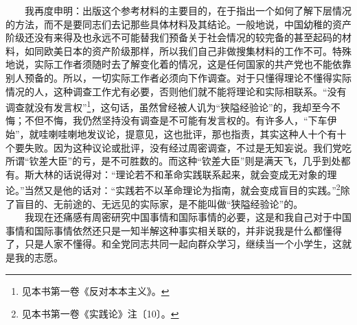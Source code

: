 \documentclass[cn,11pt,chinese]{elegantbook}
\begin{document}
　　我再度申明：出版这个参考材料的主要目的，在于指出一个如何了解下层情况的方法，而不是要同志们去记那些具体材料及其结论。一般地说，中国幼稚的资产阶级还没有来得及也永远不可能替我们预备关于社会情况的较完备的甚至起码的材料，如同欧美日本的资产阶级那样，所以我们自己非做搜集材料的工作不可。特殊地说，实际工作者须随时去了解变化着的情况，这是任何国家的共产党也不能依靠别人预备的。所以，一切实际工作者必须向下作调查。对于只懂得理论不懂得实际情况的人，这种调查工作尤有必要，否则他们就不能将理论和实际相联系。“没有调查就没有发言权”\footnote[3]{ 见本书第一卷《反对本本主义》。}，这句话，虽然曾经被人讥为“狭隘经验论”的，我却至今不悔；不但不悔，我仍然坚持没有调查是不可能有发言权的。有许多人，“下车伊始”，就哇喇哇喇地发议论，提意见，这也批评，那也指责，其实这种人十个有十个要失败。因为这种议论或批评，没有经过周密调查，不过是无知妄说。我们党吃所谓“钦差大臣”的亏，是不可胜数的。而这种“钦差大臣”则是满天飞，几乎到处都有。斯大林的话说得对：“理论若不和革命实践联系起来，就会变成无对象的理论。”当然又是他的话对：“实践若不以革命理论为指南，就会变成盲目的实践。”\footnote[4]{ 见本书第一卷《实践论》注〔10〕。}除了盲目的、无前途的、无远见的实际家，是不能叫做“狭隘经验论”的。\\
　　我现在还痛感有周密研究中国事情和国际事情的必要，这是和我自己对于中国事情和国际事情依然还只是一知半解这种事实相关联的，并非说我是什么都懂得了，只是人家不懂得。和全党同志共同一起向群众学习，继续当一个小学生，这就是我的志愿。\\
\end{document}
